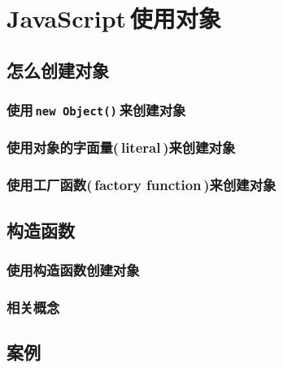 
\chapter{JavaScript\,使用对象}

\section{怎么创建对象}

\subsection{使用\,\lstinline|new Object()|\,来创建对象}

\subsection{使用对象的字面量(\,literal\,)来创建对象}

\subsection{使用工厂函数(\,factory function\,)来创建对象}



\section{构造函数}


\subsection{使用构造函数创建对象}

\subsection{相关概念}

\section{案例}
